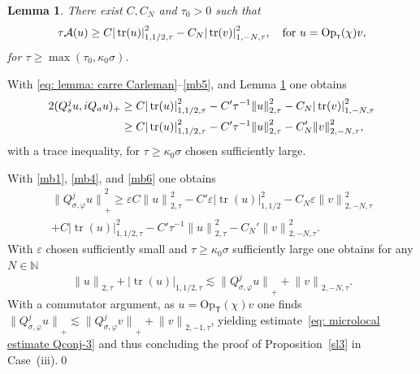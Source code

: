 \documentclass[10pt]{amsart}
\theoremstyle{plain}
\newtheorem{lemma}[theorem]{Lemma}
\theoremstyle{definition}
\def\N{\mathbb{N}}
\newcommand{\suff}{sufficiently\xspace}
\let\k\kappa
\let \Re \relax
\DeclareMathOperator{\Re}{Re}
\newcommand{\inp}[2]{(#1, #2)}
\newcommand{\Opt}{\ensuremath{\mathrm{Op}_{\scriptscriptstyle{\mathsf{T}}}}}
\newcommand{\Norm}[2]{{\| #1 \|}_{#2}}
\newcommand{\norm}[2]{{|#1|}_{#2}}
\newcommand{\Normsc}[2]{{\| #1 \|}_{#2, \tau}}
\newcommand{\normsc}[2]{{| #1 |}_{#2, \tau}}
\newcommand{\Qconj}{Q_{\sigma,\varphi}}
\newcommand{\Qs}{Q_{s}}
\newcommand{\Qa}{Q_{a}}
\DeclareMathOperator{\trace}{tr}
\begin{document}
\begin{lemma}\label{sl4}
There exist $C, C_N$ and $\tau_{0}>0$ such that
\begin{equation*}
\tau \Re\mathcal{A}(u)
\geq C \normsc{\trace (u)}{1,1/2}^2
-C_N \normsc{\trace(v)}{1,-N}^2,
\quad \text{for}\ u = \Opt(\chi)v,
\end{equation*}
for $\tau\geq \max(\tau_0, \k_0\sigma)$.
\end{lemma}
With \eqref{eq: lemma: carre Carleman}--\eqref{mb5}, and
Lemma \ref{sl4} one obtains
\begin{align}\label{mb6}\notag
2\Re \inp{\Qs^ju}{i\Qa u}_+
&\geq C \normsc{\trace (u)}{1,1/2}^2
- C' \tau^{-1} \Normsc{u}{2}^2
- C_N \normsc{\trace(v)}{1,-N}^2\\
&\geq C \normsc{\trace (u)}{1,1/2}^2
- C' \tau^{-1} \Normsc{u}{2}^2
- C_N' \Normsc{v}{2,-N}^2,
\end{align}
with a trace inequality, for $\tau \geq \k_0 \sigma$ chosen \suff large.

With \eqref{mb1}, \eqref{mb4}, and \eqref{mb6} one obtains
\begin{multline*}
\Norm{\Qconj^ju}{+}^2 \geq
\varepsilon C\Normsc{u}{2}^2
-C'\varepsilon \norm{\trace(u)}{1,1/2}^2
-C_N\varepsilon\Normsc{v}{2,-N}^2\\
 + C \normsc{\trace (u)}{1,1/2}^2
- C' \tau^{-1} \Normsc{u}{2}^2
- C_N' \Normsc{v}{2,-N}^2.
\end{multline*}
With $\varepsilon$ chosen \suff small and $\tau \geq \k_0 \sigma$
\suff large one obtains for any $N\in\N$
\begin{equation*}
\Normsc{u}{2} + \normsc{\trace (u)}{1,1/2}
\lesssim \Norm{\Qconj^ju}{+} +\Normsc{v}{2,-N}.
\end{equation*}
With a commutator argument, as $u=\Opt(\chi)v$ one finds
$ \Norm{\Qconj^ju}{+} \lesssim
\Norm{\Qconj^j v}{+} +\Normsc{v}{2,-1}
$, yielding estimate~\eqref{eq: microlocal estimate Qconj-3}
and thus concluding the proof of Proposition~\ref{sl3} in Case~(iii).\qed
\end{document}
